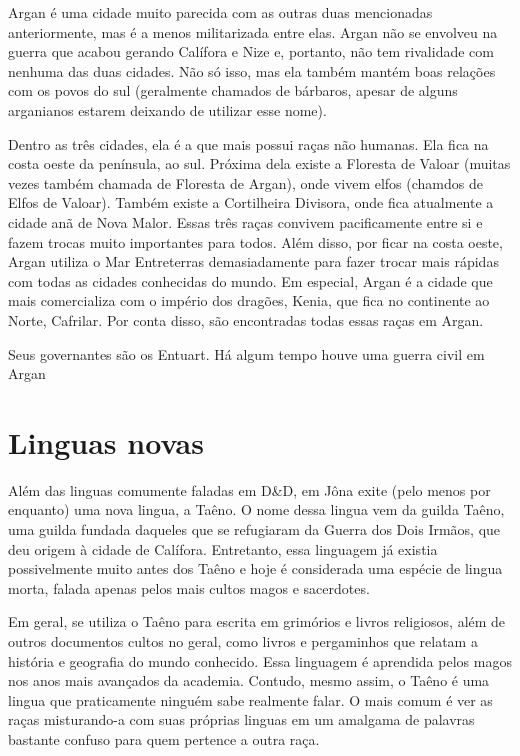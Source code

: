 \documentclass{RPG_Adventure}[2021/10/20]
\begin{document}
Argan é uma cidade muito parecida com as outras duas mencionadas anteriormente,
mas é a menos militarizada entre elas. Argan não se envolveu na guerra que
acabou gerando Calífora e Nize e, portanto, não tem rivalidade com nenhuma das
duas cidades. Não só isso, mas ela também mantém boas relações com os povos do
sul (geralmente chamados de bárbaros, apesar de alguns arganianos estarem
deixando de utilizar esse nome).

Dentro as três cidades, ela é a que mais possui raças não humanas. Ela fica na
costa oeste da península, ao sul. Próxima dela existe a Floresta de Valoar
(muitas vezes também chamada de Floresta de Argan), onde vivem elfos (chamdos de
Elfos de Valoar). Também existe a Cortilheira Divisora, onde fica atualmente a
cidade anã de Nova Malor. Essas três raças convivem pacificamente entre si e
fazem trocas muito importantes para todos. Além disso, por ficar na costa oeste,
Argan utiliza o Mar Entreterras demasiadamente para fazer trocar mais rápidas
com todas as cidades conhecidas do mundo. Em especial, Argan é a cidade que mais
comercializa com o império dos dragões, Kenia, que fica no continente ao Norte,
Cafrilar. Por conta disso, são encontradas todas essas raças em Argan.

Seus governantes são os Entuart. Há algum tempo houve uma guerra civil em Argan


\section{Linguas novas}%

Além das linguas comumente faladas em D&D, em Jôna exite (pelo menos por
enquanto) uma nova lingua, a Taêno. O nome dessa lingua vem da guilda Taêno, uma
guilda fundada daqueles que se refugiaram da Guerra dos Dois Irmãos, que deu
origem à cidade de Calífora. Entretanto, essa linguagem já existia possivelmente
muito antes dos Taêno e hoje é considerada uma espécie de lingua morta, falada
apenas pelos mais cultos magos e sacerdotes.

Em geral, se utiliza o Taêno para escrita em grimórios e livros religiosos, além
de outros documentos cultos no geral, como livros e pergaminhos que relatam a
história e geografia do mundo conhecido. Essa linguagem é aprendida pelos magos
nos anos mais avançados da academia. Contudo, mesmo assim, o Taêno é uma lingua
que praticamente ninguém sabe realmente falar. O mais comum é ver as raças
misturando-a com suas próprias linguas em um amalgama de palavras bastante
confuso para quem pertence a outra raça.
\end{document}
